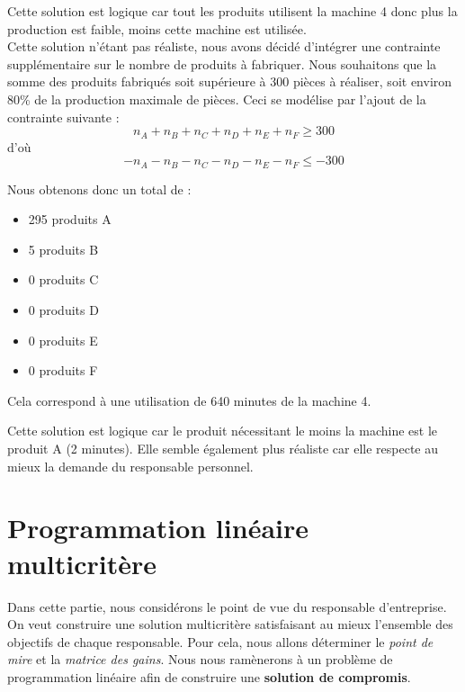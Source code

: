 \documentclass[a4paper,10pt]{article}
\begin{document}
Cette solution est logique car tout les produits utilisent la machine 4 donc plus la production est faible, moins cette machine est utilisée.\\

Cette solution n'étant pas réaliste, nous avons décidé d'intégrer une contrainte supplémentaire sur le nombre de produits à fabriquer. Nous souhaitons que la somme des produits fabriqués soit supérieure à 300 pièces à réaliser, soit environ 80\% de la production maximale de pièces.
Ceci se modélise par l'ajout de la contrainte suivante :\\

$$n_A + n_B + n_C + n_D + n_E + n_F \geq 300$$
d'où $$-n_A -n_B -n_C -n_D -n_E -n_F \leq -300$$

Nous obtenons donc un total de :\newline
\begin{itemize}
\item[\textbullet] 295 produits A
\item[\textbullet] 5 produits B
\item[\textbullet] 0 produits C
\item[\textbullet] 0 produits D
\item[\textbullet] 0 produits E
\item[\textbullet] 0 produits F\newline
\end{itemize}
Cela correspond à une utilisation de 640 minutes de la machine 4.\newline

Cette solution est logique car le produit nécessitant le moins la machine est le produit A (2 minutes). Elle semble également plus réaliste car elle respecte au mieux la demande du responsable personnel.


\newpage
\part{Programmation linéaire multicritère}

Dans cette partie, nous considérons le point de vue du responsable d'entreprise. On veut construire une solution multicritère satisfaisant au mieux l'ensemble des objectifs de chaque responsable. Pour cela, nous allons déterminer le \emph{point de mire} et la \emph{matrice des gains}. Nous nous ramènerons à un problème de programmation linéaire afin de construire une \textbf{solution de compromis}.
\end{document}
